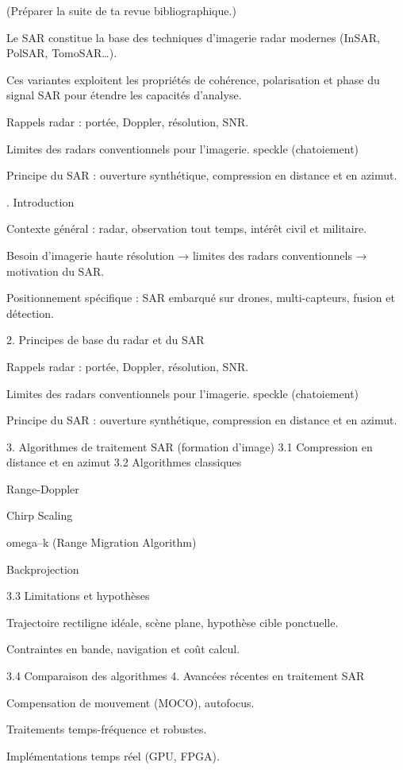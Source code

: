 (Préparer la suite de ta revue bibliographique.)

Le SAR constitue la base des techniques d’imagerie radar modernes (InSAR, PolSAR, TomoSAR…).

Ces variantes exploitent les propriétés de cohérence, polarisation et phase du signal SAR pour étendre les capacités d’analyse.

Rappels radar : portée, Doppler, résolution, SNR.

Limites des radars conventionnels pour l’imagerie.
speckle (chatoiement) 

Principe du SAR : ouverture synthétique, compression en distance et en azimut.




. Introduction

Contexte général : radar, observation tout temps, intérêt civil et militaire.

Besoin d’imagerie haute résolution → limites des radars conventionnels → motivation du SAR.

Positionnement spécifique : SAR embarqué sur drones, multi-capteurs, fusion et détection.

2. Principes de base du radar et du SAR

Rappels radar : portée, Doppler, résolution, SNR.

Limites des radars conventionnels pour l’imagerie.
speckle (chatoiement) 

Principe du SAR : ouverture synthétique, compression en distance et en azimut.

3. Algorithmes de traitement SAR (formation d’image)
3.1 Compression en distance et en azimut
3.2 Algorithmes classiques

Range-Doppler

Chirp Scaling

omega–k (Range Migration Algorithm)

Backprojection

3.3 Limitations et hypothèses

Trajectoire rectiligne idéale, scène plane, hypothèse cible ponctuelle.

Contraintes en bande, navigation et coût calcul.

3.4 Comparaison des algorithmes
4. Avancées récentes en traitement SAR

Compensation de mouvement (MOCO), autofocus.

Traitements temps-fréquence et robustes.

Implémentations temps réel (GPU, FPGA).

